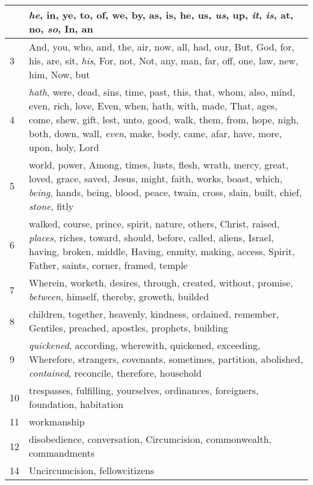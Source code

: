 \begin{center}
\begin{longtable}{l|p{3.75in}}
\hline \hline 
\endlastfoot 
2 & \emph{he}, in, ye, to, of, we, by, as, is, he, us, \emph{us}, up, \emph{it}, \emph{is}, at, no, \emph{so}, In, an\\ \hline 
3 & And, you, who, and, the, air, now, all, had, our, But, God, for, his, are, sit, \emph{his}, For, not, Not, any, man, far, off, one, law, new, him, Now, but\\ \hline 
4 & \emph{hath}, were, dead, sins, time, past, this, that, whom, also, mind, even, rich, love, Even, when, hath, with, made, That, ages, come, shew, gift, lest, unto, good, walk, them, from, hope, nigh, both, down, wall, \emph{even}, make, body, came, afar, have, more, upon, holy, Lord\\ \hline 
5 & world, power, Among, times, lusts, flesh, wrath, mercy, great, loved, grace, saved, Jesus, might, faith, works, boast, which, \emph{being}, hands, being, blood, peace, twain, cross, slain, built, chief, \emph{stone}, fitly\\ \hline 
6 & walked, course, prince, spirit, nature, others, Christ, raised, \emph{places}, riches, toward, should, before, called, aliens, Israel, having, broken, middle, Having, enmity, making, access, Spirit, Father, saints, corner, framed, temple\\ \hline 
7 & Wherein, worketh, desires, through, created, without, promise, \emph{between}, himself, thereby, groweth, builded\\ \hline 
8 & children, together, heavenly, kindness, ordained, remember, Gentiles, preached, apostles, prophets, building\\ \hline 
9 & \emph{quickened}, according, wherewith, quickened, exceeding, Wherefore, strangers, covenants, sometimes, partition, abolished, \emph{contained}, reconcile, therefore, household\\ \hline 
10 & trespasses, fulfilling, yourselves, ordinances, foreigners, foundation, habitation\\ \hline 
11 & workmanship\\ \hline 
12 & disobedience, conversation, Circumcision, commonwealth, commandments\\ \hline 
14 & Uncircumcision, fellowcitizens\\ \hline 
\end{longtable} 
\end{center} 




 
